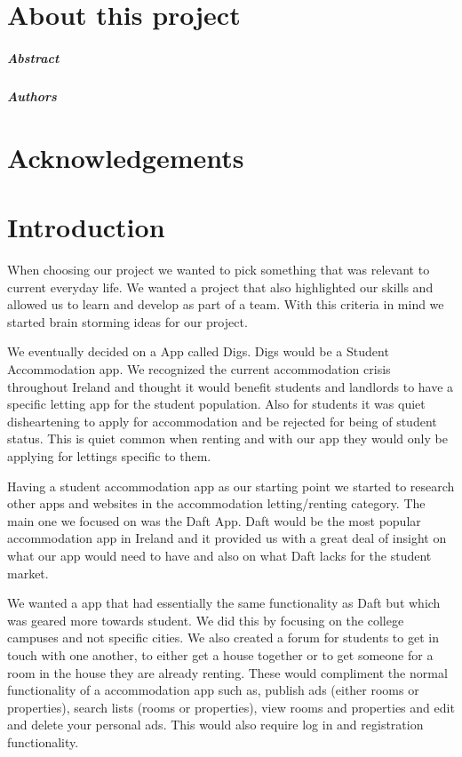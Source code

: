 
\chapter*{About this project}

\paragraph{Abstract}


\paragraph{Authors}


\chapter*{Acknowledgements}


\chapter{Introduction}

When choosing our project we wanted to pick something that was relevant to current everyday life. We wanted a project that also highlighted our skills and allowed us to learn and develop as part of a team. With this criteria in mind we started brain storming ideas for our project.

We eventually decided on a App called Digs. Digs would be a Student Accommodation app. We recognized the current accommodation crisis throughout Ireland and thought it would benefit students and landlords to have a specific letting app for the student population. Also for students it was quiet disheartening to apply for accommodation and be rejected for being of student status. This is quiet common when renting and with our app they would only be applying for lettings specific to them.

Having a student accommodation app as our starting point we started to research other apps and websites in the accommodation letting/renting category. The main one we focused on was the Daft App\cite{Daft}. Daft would be the most popular accommodation app in Ireland and it provided us with a great deal of insight on what our app would need to have and also on what Daft lacks for the student market. 

We wanted a app that had essentially the same functionality as Daft but which was geared more towards student. We did this by focusing on the college campuses and not specific cities. We also created a forum for students to get in touch with one another, to either get a house together or to get someone for a room in the house they are already renting. These would compliment the normal functionality of a accommodation app such as, publish ads (either rooms or properties), search lists (rooms or properties), view rooms and properties and edit and delete your personal ads. This would also require log in and registration functionality.

